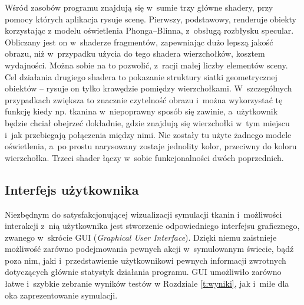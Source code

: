 		Wśród zasobów programu znajdują się w~sumie trzy główne shadery, przy pomocy których aplikacja rysuje scenę. Pierwszy, podstawowy, renderuje obiekty korzystając z modelu oświetlenia Phonga--Blinna, z~obsługą rozbłysku specular. Obliczany jest on w~shaderze fragmentów, zapewniając dużo lepszą jakość obrazu, niż w~przypadku użycia do tego shadera wierzchołków, kosztem wydajności. Można sobie na to pozwolić, z~racji małej liczby elementów sceny. Cel działania drugiego shadera to pokazanie struktury siatki geometrycznej obiektów -- rysuje on tylko krawędzie pomiędzy wierzchołkami. W~szczególnych przypadkach zwiększa to znacznie czytelność obrazu i~można wykorzystać tę funkcję kiedy np. tkanina w~niepoprawny sposób się zawinie, a~użytkownik będzie chciał obejrzeć dokładnie, gdzie znajdują się wierzchołki w~tym miejscu i~jak przebiegają połączenia między nimi. Nie zostały tu użyte żadnego modele oświetlenia, a~po prostu narysowany zostaje jednolity kolor, przeciwny do koloru wierzchołka. Trzeci shader łączy w~sobie funkcjonalności dwóch poprzednich.
		
		\subsection{Interfejs użytkownika}
		\label{t:praktyka:silnik:gui}
		
		
		Niezbędnym do satysfakcjonującej wizualizacji symulacji tkanin i~możliwości interakcji z~nią użytkownika jest stworzenie odpowiedniego interfejsu graficznego, zwanego w~skrócie GUI (\emph{Graphical User Interface}). Dzięki niemu zaistnieje możliwość zarówno podejmowania pewnych akcji w~symulowanym świecie, bądź poza nim, jaki i~przedstawienie użytkownikowi pewnych informacji zwrotnych dotyczących głównie statystyk działania programu. GUI umożliwiło zarówno łatwe i~szybkie zebranie wyników testów w Rozdziale \ref{t:wyniki}, jak i~miłe dla oka zaprezentowanie symulacji.
		
